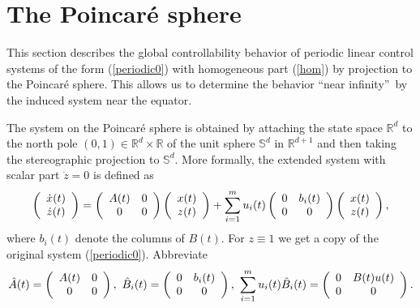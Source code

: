 \documentclass{siamltex}%
\begin{document}
\section{The Poincar\'{e} sphere\label{Section5}}

This section describes the global controllability behavior of periodic linear
control systems of the form (\ref{periodic0}) with homogeneous part
(\ref{hom}) by projection to the Poincar\'{e} sphere. This allows us to
determine the behavior \textquotedblleft near infinity\textquotedblright\ by
the induced system near the equator.

The system on the Poincar\'{e} sphere is obtained by attaching the state space
$\mathbb{R}^{d}$ to the north pole $(0,1)\in\mathbb{R}^{d}\times\mathbb{R}$ of
the unit sphere $\mathbb{S}^{d}$ in $\mathbb{R}^{d+1}$ and then taking the
stereographic projection to $\mathbb{S}^{d}$. More formally, the extended
system with scalar part $\dot{z}=0$ is defined as%
\begin{equation}
\left(
\begin{array}
[c]{c}%
\dot{x}(t)\\
\dot{z}(t)
\end{array}
\right)  =\left(
\begin{array}
[c]{cc}%
A(t) & 0\\
0 & 0
\end{array}
\right)  \left(
\begin{array}
[c]{c}%
x(t)\\
z(t)
\end{array}
\right)  +\sum_{i=1}^{m}u_{i}(t)\left(
\begin{array}
[c]{cc}%
0 & b_{i}(t)\\
0 & 0
\end{array}
\right)  \left(
\begin{array}
[c]{c}%
x(t)\\
z(t)
\end{array}
\right)  , \label{ext}%
\end{equation}
where $b_{i}(t)$ denote the columns of $B(t)$. For $z\equiv1$ we get a copy of
the original system (\ref{periodic0}). Abbreviate%
\[
\hat{A}(t)=\left(
\begin{array}
[c]{cc}%
A(t) & 0\\
0 & 0
\end{array}
\right)  ,~\hat{B}_{i}(t)=\left(
\begin{array}
[c]{cc}%
0 & b_{i}(t)\\
0 & 0
\end{array}
\right)  ,~\sum_{i=1}^{m}u_{i}(t)\hat{B}_{i}(t)=\left(
\begin{array}
[c]{cc}%
0 & B(t)u(t)\\
0 & 0
\end{array}
\right)  .
\]
\end{document}
